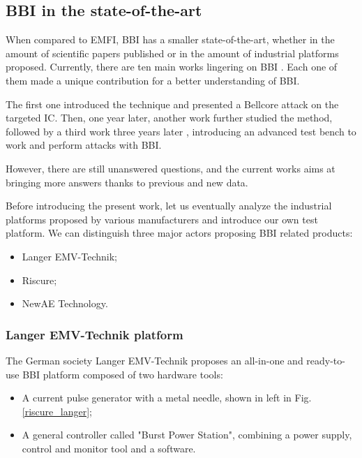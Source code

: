 	\subsection{BBI in the state-of-the-art}
		When compared to EMFI, BBI has a smaller state-of-the-art, whether in the amount of scientific papers published or in the amount of industrial platforms proposed.
		Currently, there are ten main works lingering on BBI \cite{bbiOrigin, bbiSecond, bbiThird, bbiColin,japbbi, japbbi2, mybbiCosade, mybbiFdtc2022, mybbifdtc2023, colinFdtc2023}.
		Each one of them made a unique contribution for a better understanding of BBI.

		The first one \cite{bbiOrigin} introduced the technique and presented a Bellcore attack on the targeted IC.
		Then, one year later, another work \cite{bbiSecond} further studied the method, followed by a third work three years later \cite{bbiThird}, introducing an advanced test bench to work and perform attacks with BBI.

		However, there are still unanswered questions, and the current works aims at bringing more answers thanks to previous and new data.

		Before introducing the present work, let us eventually analyze the industrial platforms proposed by various manufacturers and introduce our own test platform.
		We can distinguish three major actors proposing BBI related products:
		\begin{itemize}
			\item Langer EMV-Technik;
			\item Riscure;
			\item NewAE Technology.
		\end{itemize}

		
		\subsubsection{Langer EMV-Technik platform}
			The German society Langer EMV-Technik proposes an all-in-one and ready-to-use BBI platform composed of two hardware tools:
			\begin{itemize}
				\item A current pulse generator with a metal needle, shown in left in Fig. \ref{riscure_langer};
				\item A general controller called "Burst Power Station", combining a power supply, control and monitor tool and a software.
			\end{itemize}

